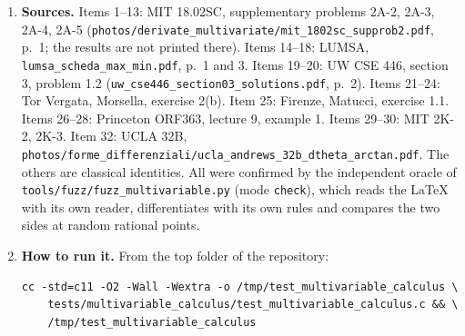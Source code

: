\documentclass[11pt,a4paper]{article}
\begin{document}
\begin{enumerate}
\item \textbf{Sources.} Items 1--13: MIT 18.02SC, supplementary problems 2A-2, 2A-3, 2A-4, 2A-5 (\texttt{photos/derivate\_multivariate/mit\_1802sc\_supprob2.pdf}, p.~1; the results are not printed there). Items 14--18: LUMSA, \texttt{lumsa\_scheda\_max\_min.pdf}, p.~1 and 3. Items 19--20: UW CSE 446, section 3, problem 1.2 (\texttt{uw\_cse446\_section03\_solutions.pdf}, p.~2). Items 21--24: Tor Vergata, Morsella, exercise 2(b). Item 25: Firenze, Matucci, exercise 1.1. Items 26--28: Princeton ORF363, lecture 9, example 1. Items 29--30: MIT 2K-2, 2K-3. Item 32: UCLA 32B, \texttt{photos/forme\_differenziali/ucla\_andrews\_32b\_dtheta\_arctan.pdf}. The others are classical identities. All were confirmed by the independent oracle of \texttt{tools/fuzz/fuzz\_multivariable.py} (mode \texttt{check}), which reads the LaTeX with its own reader, differentiates with its own rules and compares the two sides at random rational points.

\item \textbf{How to run it.} From the top folder of the repository:
\begin{verbatim}
cc -std=c11 -O2 -Wall -Wextra -o /tmp/test_multivariable_calculus \
    tests/multivariable_calculus/test_multivariable_calculus.c && \
    /tmp/test_multivariable_calculus
\end{verbatim}
\end{enumerate}
\end{document}
